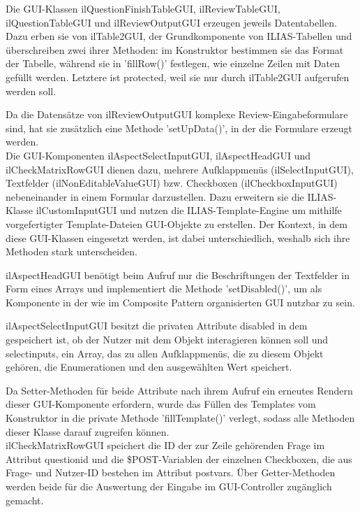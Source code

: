 \documentclass[a4paper]{scrreprt}
\begin{document}
Die GUI-Klassen ilQuestionFinishTableGUI, ilReviewTableGUI, ilQuestionTableGUI und ilReviewOutputGUI erzeugen jeweils Datentabellen. 
Dazu erben sie von ilTable2GUI, der Grundkomponente von ILIAS-Tabellen und überschreiben zwei ihrer Methoden: im Konstruktor bestimmen sie das Format der Tabelle, während sie in 'fillRow()' festlegen, wie einzelne Zeilen mit Daten gefüllt werden. 
Letztere ist protected, weil sie nur durch ilTable2GUI aufgerufen werden soll.
 
Da die Datensätze von ilReviewOutputGUI komplexe Review-Eingabeformulare sind, hat sie zusätzlich eine Methode 'setUpData()', in der die Formulare erzeugt werden.\\

Die GUI-Komponenten ilAspectSelectInputGUI, ilAspectHeadGUI und ilCheckMatrixRowGUI dienen dazu, mehrere Aufklappmenüs (ilSelectInputGUI), Textfelder (ilNonEditableValueGUI) bzw. Checkboxen (ilCheckboxInputGUI) nebeneinander in einem Formular darzustellen. 
Dazu erweitern sie die ILIAS-Klasse ilCustomInputGUI und nutzen die ILIAS-Template-Engine um mithilfe vorgefertigter Template-Dateien GUI-Objekte zu erstellen. 
Der Kontext, in dem diese GUI-Klassen eingesetzt werden, ist dabei unterschiedlich, weshalb sich ihre Methoden stark unterscheiden.

ilAspectHeadGUI benötigt beim Aufruf nur die Beschriftungen der Textfelder in Form eines Arrays und implementiert die Methode 'setDisabled()', um als Komponente in der wie im Composite Pattern organisierten GUI nutzbar zu sein.
 
ilAspectSelectInputGUI besitzt die privaten Attribute disabled in dem gespeichert ist, ob der Nutzer mit dem Objekt interagieren können soll und select\textunderscore inputs, ein Array, das zu allen Aufklappmenüs, die zu diesem Objekt gehören, die Enumerationen und den ausgewählten Wert speichert. 

Da Setter-Methoden für beide Attribute nach ihrem Aufruf ein erneutes Rendern dieser GUI-Komponente erfordern, wurde das Füllen des Templates vom Konstruktor in die private Methode 'fillTemplate()' verlegt, sodass alle Methoden dieser Klasse darauf zugreifen können. \\

ilCheckMatrixRowGUI speichert die ID der zur Zeile gehörenden Frage im Attribut question\textunderscore id und die \$\textunderscore POST-Variablen der einzelnen Checkboxen, die aus Frage- und Nutzer-ID bestehen im Attribut postvars. 
Über Getter-Methoden werden beide für die Auswertung der Eingabe im GUI-Controller zugänglich gemacht.\\
\end{document}

